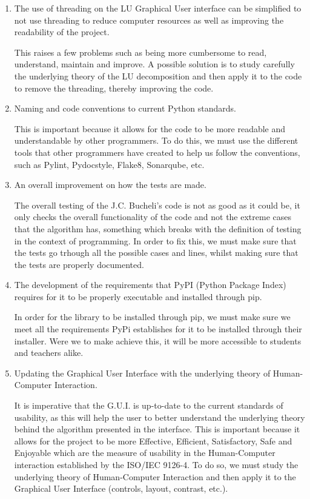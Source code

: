\begin{enumerate}
    \item The use of threading on the LU Graphical User interface can be simplified to not use threading to reduce computer resources as well as improving the readability of the project.
    
    This raises a few problems such as being more cumbersome to read, understand, maintain and improve. A possible solution is to study carefully the underlying theory of the LU decomposition and then apply it to the code to remove the threading, thereby improving the code. 
    \item Naming and code conventions to current Python standards.
    
    This is important because it allows for the code to be more readable and understandable by other programmers. To do this, we must use the different tools that other programmers have created to help us follow the conventions, such as Pylint, Pydocstyle, Flake8, Sonarqube, etc.

    \item An overall improvement on how the tests are made.
    
    The overall testing of the J.C. Bucheli's code is not as good as it could be, it only checks the overall functionality of the code and not the extreme cases that the algorithm has, something which breaks with the definition of testing in the context of programming. In order to fix this, we must make sure that the tests go trhough all the possible cases and lines, whilst making sure that the tests are properly documented.

    \item The development of the requirements that PyPI (Python Package Index) requires for it to be properly executable and installed through pip.
    


    In order for the library to be installed through pip, we must make sure we meet all the requirements PyPi establishes for it to be installed through their installer. Were we to make achieve this, it will be more accessible to students and teachers alike.
    \item Updating the Graphical User Interface with the underlying theory of Human-Computer Interaction.
    
    It is imperative that the G.U.I. is up-to-date to the current standards of usability, as this will help the user to better understand the underlying theory behind the algorithm presented in the interface. This is important because it allows for the project to be more Effective, Efficient, Satisfactory, Safe and Enjoyable which are the measure of usability in the Human-Computer interaction established by the ISO/IEC 9126-4. To do so, we must study the underlying theory of Human-Computer Interaction and then apply it to the Graphical User Interface (controls, layout, contrast, etc.).
\end{enumerate}

